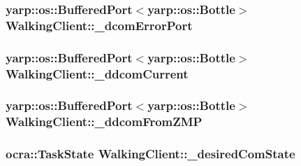 \hypertarget{classWalkingClient_a1b01264c9d9d403a68a149d86d1bc53f}{
\subsubsection[{\-\_\-dcom\-Error\-Port}]{\setlength{\rightskip}{0pt plus 5cm}yarp\-::os\-::\-Buffered\-Port$<$yarp\-::os\-::\-Bottle$>$ {\bf \-Walking\-Client\-::\-\_\-dcom\-Error\-Port}}}\label{classWalkingClient_a1b01264c9d9d403a68a149d86d1bc53f}
\hypertarget{classWalkingClient_a692d95b3e76a396d107b0c29a3d591f1}{
\subsubsection[{\-\_\-ddcom\-Current}]{\setlength{\rightskip}{0pt plus 5cm}yarp\-::os\-::\-Buffered\-Port$<$yarp\-::os\-::\-Bottle$>$ {\bf \-Walking\-Client\-::\-\_\-ddcom\-Current}}}\label{classWalkingClient_a692d95b3e76a396d107b0c29a3d591f1}
\hypertarget{classWalkingClient_a41b7320607812418af496b8b2c30204f}{
\subsubsection[{\-\_\-ddcom\-From\-Z\-M\-P}]{\setlength{\rightskip}{0pt plus 5cm}yarp\-::os\-::\-Buffered\-Port$<$yarp\-::os\-::\-Bottle$>$ {\bf \-Walking\-Client\-::\-\_\-ddcom\-From\-Z\-M\-P}}}\label{classWalkingClient_a41b7320607812418af496b8b2c30204f}
\hypertarget{classWalkingClient_a2625bf687aa3141f5a2404c8d9b3c392}{
\subsubsection[{\-\_\-desired\-Com\-State}]{\setlength{\rightskip}{0pt plus 5cm}ocra\-::\-Task\-State {\bf \-Walking\-Client\-::\-\_\-desired\-Com\-State}}}\label{classWalkingClient_a2625bf687aa3141f5a2404c8d9b3c392}
